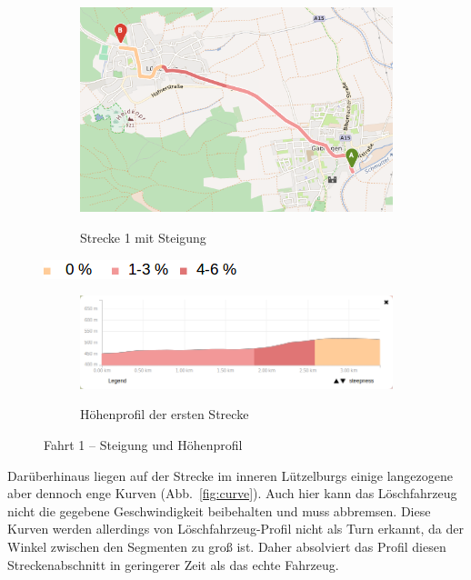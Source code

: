 \begin{figure}[htb]
\centering
\begin{subfigure}{0.80\textwidth}
\centering
\includegraphics[width = \textwidth]{../media/Fahrt1_Steep.png} \\
\caption{Strecke 1 mit Steigung}
\label{fig:steig}
\end{subfigure}

\includegraphics[width =0.25 \textwidth]{../media/legend2.png} \\

\begin{subfigure}{ \textwidth}
\centering
\includegraphics[width = \textwidth]{../media/Fahrt1_Profile.png} \\
\caption{Höhenprofil der ersten Strecke}
\label{profile}
\end{subfigure}
\caption{Fahrt 1 -- Steigung und Höhenprofil}
\label{steig}
\end{figure}

Darüberhinaus liegen auf der Strecke im inneren Lützelburgs einige langezogene aber dennoch enge Kurven (Abb.~\ref{fig:curve}).
Auch hier kann das Löschfahrzeug nicht die gegebene Geschwindigkeit beibehalten und muss abbremsen.
Diese Kurven werden allerdings von Löschfahrzeug-Profil nicht als Turn erkannt, da der Winkel zwischen den Segmenten zu groß ist.
Daher absolviert das Profil diesen Streckenabschnitt in geringerer Zeit als das echte Fahrzeug.

